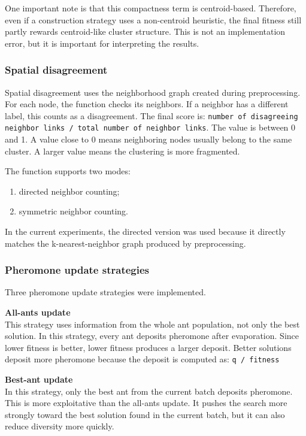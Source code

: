 \documentclass[11pt]{article}
\begin{document}
One important note is that this compactness term is centroid-based. Therefore, even if a construction strategy uses a non-centroid heuristic, the final fitness still partly rewards centroid-like cluster structure. This is not an implementation error, but it is important for interpreting the results.

\subsubsection{Spatial disagreement}
Spatial disagreement uses the neighborhood graph created during preprocessing. For each node, the function checks its neighbors. If a neighbor has a different label, this counts as a disagreement. The final score is:
\texttt{number of disagreeing neighbor links / total number of neighbor links}. The value is between 0 and 1. A value close to 0 means neighboring nodes usually belong to the same cluster. A larger value means the clustering is more fragmented.

The function supports two modes:
\begin{enumerate}
  \item directed neighbor counting;
  \item symmetric neighbor counting.
\end{enumerate}

In the current experiments, the directed version was used because it directly matches the k-nearest-neighbor graph produced by preprocessing.


\subsubsection{Pheromone update strategies}
Three pheromone update strategies were implemented.

\textbf{All-ants update} \\
This strategy uses information from the whole ant population, not only the best solution. In this strategy, every ant deposits pheromone after evaporation. Since lower fitness is better, lower fitness produces a larger deposit. Better solutions deposit more pheromone because the deposit is computed as:
\texttt{q / fitness}

\textbf{Best-ant update} \\
In this strategy, only the best ant from the current batch deposits pheromone. This is more exploitative than the all-ants update. It pushes the search more strongly toward the best solution found in the current batch, but it can also reduce diversity more quickly.
\end{document}
